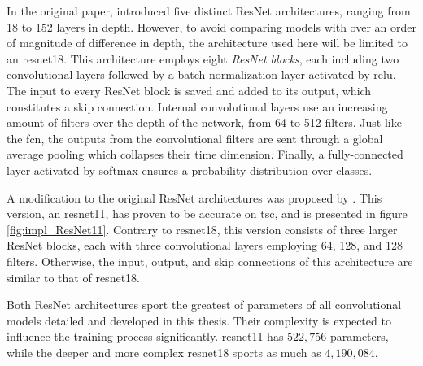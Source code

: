 In the original paper, \textcite{he2015} introduced five distinct ResNet architectures, ranging from 18 to 152 layers in depth. However, to avoid comparing models with over an order of magnitude of difference in depth, the architecture used here will be limited to an \acrfull{resnet18}. This architecture employs eight \textit{ResNet blocks}, each including two convolutional layers followed by a batch normalization layer activated by \acrshort{relu}. The input to every ResNet block is saved and added to its output, which constitutes a skip connection. Internal convolutional layers use an increasing amount of filters over the depth of the network, from 64 to 512 filters. Just like the \acrshort{fcn}, the outputs from the convolutional filters are sent through a global average pooling which collapses their time dimension. Finally, a fully-connected layer activated by softmax ensures a probability distribution over classes.

A modification to the original ResNet architectures was proposed by \textcite{wang2016}. This version, an \acrfull{resnet11}, has proven to be accurate on \acrshort{tsc}, and is presented in figure \ref{fig:impl_ResNet11}. Contrary to \acrshort{resnet18}, this version consists of three larger ResNet blocks, each with three convolutional layers employing 64, 128, and 128 filters. Otherwise, the input, output, and skip connections of this architecture are similar to that of \acrshort{resnet18}.

Both ResNet architectures sport the greatest of parameters of all convolutional models detailed and developed in this thesis. Their complexity is expected to influence the training process significantly. \acrshort{resnet11} has $522,756$ parameters, while the deeper and more complex \acrshort{resnet18} sports as much as $4,190,084$. 




